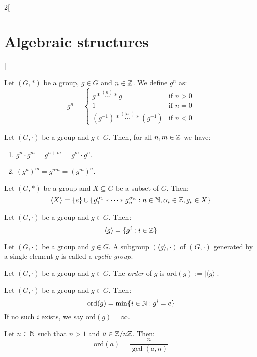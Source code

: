 \documentclass[../../../main_math.tex]{subfiles}
\begin{document}
\begin{multicols}{2}[\section{Algebraic structures}]
\begin{definition}
  \end{definition}
  \begin{definition}
    Let $(G,*)$ be a group, $g\in G$ and $n\in\mathbb{Z} $. We define $g^n$ as:
    $$g^n=
      \begin{cases}
        g*\overset{(n)}{\cdots}* g                & \text{if }n>0 \\
        1                                         & \text{if }n=0 \\
        (g^{-1})*\overset{(|n|)}{\cdots}*(g^{-1}) & \text{if }n<0
      \end{cases}$$
  \end{definition}
  \begin{lemma}
    Let $(G,\cdot)$ be a group and $g\in G$. Then, for all $n,m\in\mathbb{Z} $ we have:
    \begin{enumerate}
      \item $g^n\cdot g^m=g^{n+m}=g^m\cdot g^n$.
      \item $(g^n)^m=g^{nm}=(g^m)^n$.
    \end{enumerate}
  \end{lemma}
  \begin{proposition}
    Let $(G,*)$ be a group and $X\subseteq G$ be a subset of $G$. Then: $$\langle X\rangle=\{e\}\cup\{g_1^{\alpha_1}*\cdots* g_n^{\alpha_n}:n\in\mathbb{N} ,\alpha_i\in\mathbb{Z} ,g_i\in X\}$$
  \end{proposition}
  \begin{corollary}
    Let $(G,\cdot)$ be a group and $g\in G$. Then: $$\langle g\rangle=\{g^i:i\in\mathbb{Z} \}$$
  \end{corollary}
  \begin{definition}
    Let $(G,\cdot)$ be a group and $g\in G$. A subgroup $(\langle g\rangle,\cdot)$ of $(G,\cdot)$ generated by a single element $g$ is called a \emph{cyclic group}.
  \end{definition}
  \begin{definition}
    Let $(G,\cdot)$ be a group and $g\in G$. The \emph{order} of $g$ is $\text{ord}(g):=|\langle g\rangle|$.
  \end{definition}
  \begin{proposition}
    Let $(G,\cdot)$ be a group and $g\in G$. Then: $$\text{ord}(g)=\min\{i\in\mathbb{N} :g^i=e\}$$
    If no such $i$ exists, we say $\text{ord}(g)=\infty$.
  \end{proposition}
  \begin{corollary}
    Let $n\in\mathbb{N} $ such that $n>1$ and $\overline{a}\in\mathbb{Z} /n\mathbb{Z} $. Then: $$\text{ord}(\overline{a})=\frac{n}{\gcd(a,n)}$$

\end{corollary}
\end{multicols}
\end{document}
